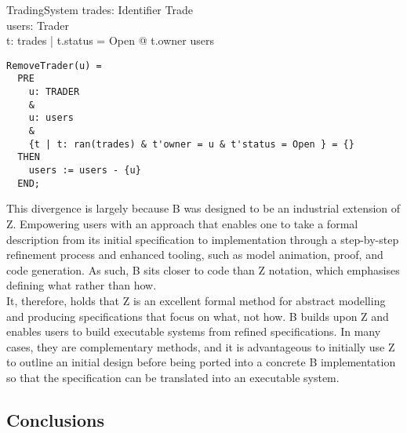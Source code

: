 \documentclass{article}
\begin{document}
\begin{schema}{TradingSystem}
trades: Identifier \pfun Trade \\
users: \power Trader \\
\where
\forall t: \ran trades | t.status = Open @ t.owner \in users \\ 
\end{schema}

\begin{verbatim}
RemoveTrader(u) = 
  PRE
    u: TRADER
    &
    u: users
    &
    {t | t: ran(trades) & t'owner = u & t'status = Open } = {}
  THEN
    users := users - {u}
  END;
\end{verbatim}

\hspace{-0.68cm} This divergence is largely because B was designed to be an industrial extension of Z. Empowering users with an approach that enables one to take a formal description from its initial specification to implementation through a step-by-step refinement process and enhanced tooling, such as model animation, proof, and code generation. As such, B sits closer to code than Z notation, which emphasises defining what rather than how. \\
\newline 
\hspace{-0.68cm} It, therefore, holds that Z is an excellent formal method for abstract modelling and producing specifications that focus on what, not how. B builds upon Z and enables users to build executable systems from refined specifications. In many cases, they are complementary methods, and it is advantageous to initially use Z to outline an initial design before being ported into a concrete B implementation so that the specification can be translated into an executable system.
\subsection*{Conclusions}
\end{document}
